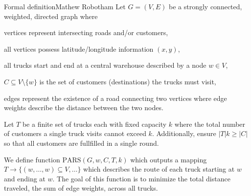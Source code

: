 \documentclass[aspectratio=169]{beamer}
\begin{document}
\begin{frame}{Formal definition\hfill\tiny Mathew Robotham}
    Let $G=(V,E)$ be a strongly connected, weighted, directed graph where
    \begin{itemize}
        {\parskip=0pt
        \item vertices represent intersecting roads and/or customers,
        \item all vertices possess latitude/longitude information $(x,y)$,
        \item all trucks start and end at a central warehouse described by a node $w\in V$,
        \item $C\subseteq V\setminus\{w\}$ is the set of customers (destinations) the trucks must visit,
        \item edges represent the existence of a road connecting two vertices where edge weights describe the distance between the two nodes.}
    \end{itemize}
    Let $T$ be a finite set of trucks each with fixed capacity $k$ where the total number of customers a single truck visits cannot exceed $k$. Additionally, ensure $|T|k\geq|C|$ so that all customers are fullfilled in a single round.

    We define function $\text{PARS}(G,w,C,T,k)$ which outputs a mapping $T\to\{(w,\dots,w)\subseteq V,\dots\}$ which describes the route of each truck starting at $w$ and ending at $w$. The goal of this function is to minimize the total distance traveled, the sum of edge weights, across all trucks.
\end{frame}

\end{document}
